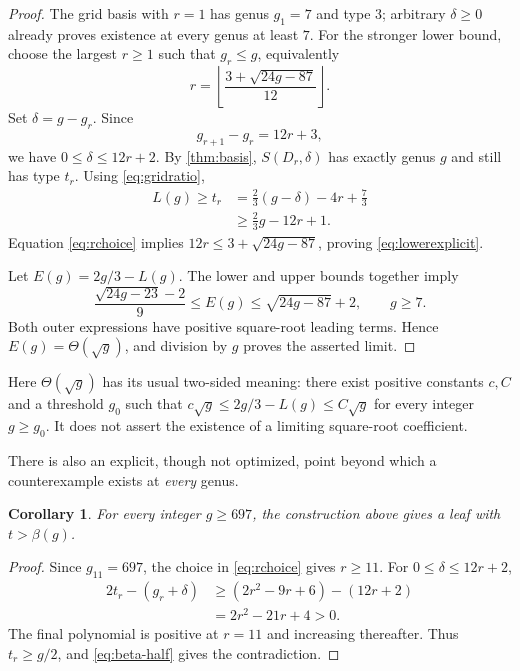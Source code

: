 \documentclass[11pt,letterpaper]{article}
\numberwithin{equation}{section}
\newtheorem{corollary}[theorem]{Corollary}
\theoremstyle{definition}
\theoremstyle{remark}
\newcommand{\conjb}{\beta}
\begin{document}
\begin{proof}
The grid basis with $r=1$ has genus $g_1=7$ and type $3$; arbitrary
$\delta\ge0$ already proves existence at every genus at least $7$.
For the stronger lower bound, choose the largest $r\ge1$ such that
$g_r\le g$, equivalently
\begin{equation}\label{eq:rchoice}
 r=\left\lfloor\frac{3+\sqrt{24g-87}}{12}\right\rfloor.
\end{equation}
Set $\delta=g-g_r$. Since
\[
 g_{r+1}-g_r=12r+3,
\]
we have $0\le\delta\le12r+2$. By \cref{thm:basis}, $S(D_r,\delta)$ has
exactly genus $g$ and still has type $t_r$. Using \eqref{eq:gridratio},
\begin{align*}
 L(g)\ge t_r
 &=\frac23(g-\delta)-4r+\frac73\\
 &\ge\frac23g-12r+1.
\end{align*}
Equation \eqref{eq:rchoice} implies
$12r\le3+\sqrt{24g-87}$, proving \eqref{eq:lowerexplicit}.

Let $E(g)=2g/3-L(g)$. The lower and upper bounds together imply
\begin{equation}\label{eq:errorbounds}
 \frac{\sqrt{24g-23}-2}{9}
 \le E(g)\le\sqrt{24g-87}+2,\qquad g\ge7.
\end{equation}
Both outer expressions have positive square-root leading terms. Hence
$E(g)=\Theta(\sqrt g)$, and division by $g$ proves the asserted limit.
\end{proof}

Here $\Theta(\sqrt g)$ has its usual two-sided meaning: there exist positive
constants $c,C$ and a threshold $g_0$ such that
$c\sqrt g\le2g/3-L(g)\le C\sqrt g$ for every integer $g\ge g_0$.
It does not assert the existence of a limiting square-root coefficient.

There is also an explicit, though not optimized, point beyond which a
counterexample exists at \emph{every} genus.

\begin{corollary}\label{cor:everygenus}
For every integer $g\ge697$, the construction above gives a leaf with
$t>\conjb(g)$.
\end{corollary}

\begin{proof}
Since $g_{11}=697$, the choice in \eqref{eq:rchoice} gives $r\ge11$.
For $0\le\delta\le12r+2$,
\begin{align*}
 2t_r-(g_r+\delta)
 &\ge (2r^2-9r+6)-(12r+2)\\
 &=2r^2-21r+4>0.
\end{align*}
The final polynomial is positive at $r=11$ and increasing thereafter.
Thus $t_r\ge g/2$, and \eqref{eq:beta-half} gives the contradiction.
\end{proof}
\end{document}
